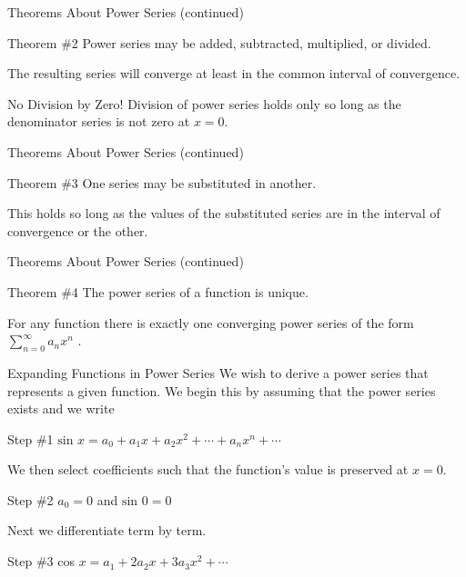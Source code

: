 \documentclass{beamer}
\begin{document}
\begin{frame}{Theorems About Power Series (continued)}
	\begin{block}{Theorem \#2}
		Power series may be added, subtracted, multiplied, or divided.
	\end{block}
	The resulting series will converge at least in the common interval of convergence.
	\begin{alertblock}{No Division by Zero!}
		Division of power series holds only so long as the denominator series is not zero at $x=0$.
	\end{alertblock}
\end{frame}
  
\begin{frame}{Theorems About Power Series (continued)}
	\begin{block}{Theorem \#3}
		One series may be substituted in another.
	\end{block}
	This holds so long as the values of the substituted series are in the interval of convergence or the other.
\end{frame}
  
\begin{frame}{Theorems About Power Series (continued)}
	\begin{block}{Theorem \#4}
		The power series of a function is unique.
	\end{block}
	For any function there is exactly one converging power series of the form $\sum_{n=0}^\infty a_nx^n$ .
\end{frame}
  
\begin{frame}{Expanding Functions in Power Series}
	We wish to derive a power series that represents a given function.  We begin this by assuming that the power series exists and we write
	\begin{exampleblock}{Step \#1}
	$\mbox{sin\ } x = a_0 + a_1x + a_2x^2+\cdots +a_nx^n+\cdots$
	\end{exampleblock}
	We then select coefficients such that the function's value is preserved at $x=0$.
	\begin{exampleblock}{Step \#2}
	$a_0=0$ and $\mbox{sin\ }0=0$
	\end{exampleblock}
	Next we differentiate term by term.
	\begin{exampleblock}{Step \#3}
	cos $x=a_1+2a_2x+3a_3x^2+\cdots$
	\end{exampleblock}
\end{frame}
  
\end{document}
